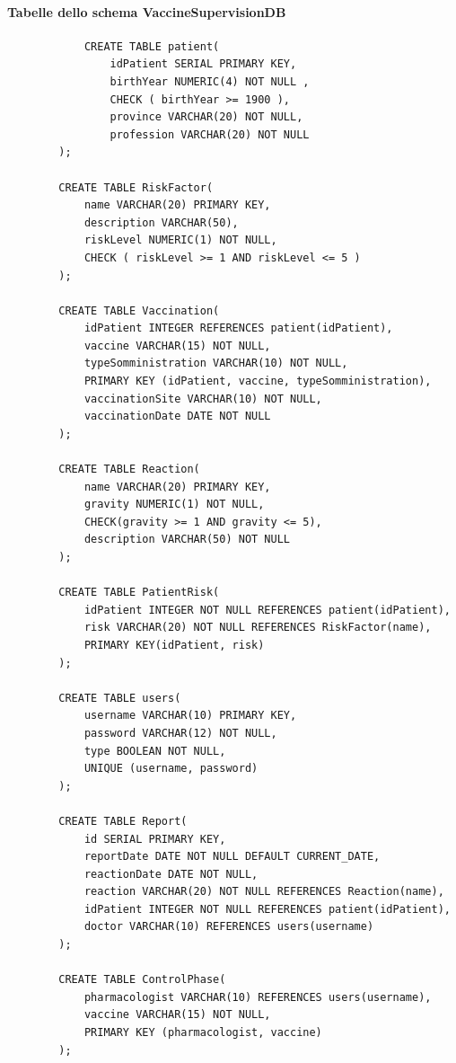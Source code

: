 \documentclass{article}
\begin{document}
    \paragraph*{Tabelle dello schema VaccineSupervisionDB}
        \begin{verbatim}
            CREATE TABLE patient(
                idPatient SERIAL PRIMARY KEY,
                birthYear NUMERIC(4) NOT NULL ,
                CHECK ( birthYear >= 1900 ),
                province VARCHAR(20) NOT NULL,
                profession VARCHAR(20) NOT NULL
        );
        
        CREATE TABLE RiskFactor(
            name VARCHAR(20) PRIMARY KEY,
            description VARCHAR(50),
            riskLevel NUMERIC(1) NOT NULL,
            CHECK ( riskLevel >= 1 AND riskLevel <= 5 )
        );
        
        CREATE TABLE Vaccination(
            idPatient INTEGER REFERENCES patient(idPatient),
            vaccine VARCHAR(15) NOT NULL,
            typeSomministration VARCHAR(10) NOT NULL,
            PRIMARY KEY (idPatient, vaccine, typeSomministration),
            vaccinationSite VARCHAR(10) NOT NULL,
            vaccinationDate DATE NOT NULL
        );
        
        CREATE TABLE Reaction(
            name VARCHAR(20) PRIMARY KEY,
            gravity NUMERIC(1) NOT NULL,
            CHECK(gravity >= 1 AND gravity <= 5),
            description VARCHAR(50) NOT NULL
        );
        
        CREATE TABLE PatientRisk(
            idPatient INTEGER NOT NULL REFERENCES patient(idPatient),
            risk VARCHAR(20) NOT NULL REFERENCES RiskFactor(name),
            PRIMARY KEY(idPatient, risk)
        );
        
        CREATE TABLE users(
            username VARCHAR(10) PRIMARY KEY,
            password VARCHAR(12) NOT NULL,
            type BOOLEAN NOT NULL,
            UNIQUE (username, password)
        );
        
        CREATE TABLE Report(
            id SERIAL PRIMARY KEY,
            reportDate DATE NOT NULL DEFAULT CURRENT_DATE,
            reactionDate DATE NOT NULL,
            reaction VARCHAR(20) NOT NULL REFERENCES Reaction(name),
            idPatient INTEGER NOT NULL REFERENCES patient(idPatient),
            doctor VARCHAR(10) REFERENCES users(username)
        );
        
        CREATE TABLE ControlPhase(
            pharmacologist VARCHAR(10) REFERENCES users(username),
            vaccine VARCHAR(15) NOT NULL,
            PRIMARY KEY (pharmacologist, vaccine)
        );
        \end{verbatim}
\end{document}
